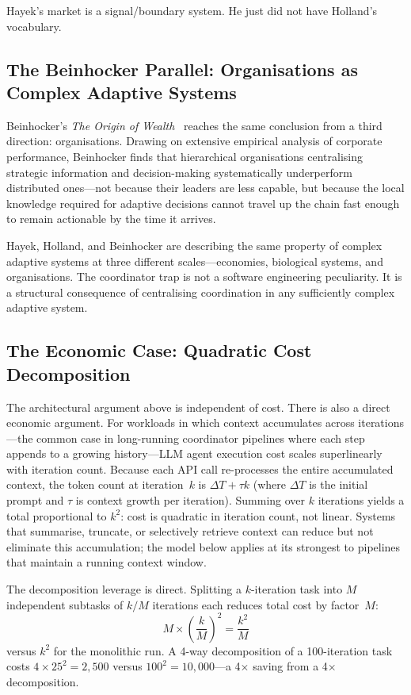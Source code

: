 \documentclass[11pt]{article}
\begin{document}
Hayek's market is a signal/boundary system. He just did not have Holland's
vocabulary.

\subsection{The Beinhocker Parallel: Organisations as Complex Adaptive Systems}

Beinhocker's \emph{The Origin of Wealth}~\cite{beinhocker} reaches the same
conclusion from a third direction: organisations. Drawing on extensive empirical
analysis of corporate performance, Beinhocker finds that hierarchical organisations
centralising strategic information and decision-making systematically underperform
distributed ones---not because their leaders are less capable, but because the
local knowledge required for adaptive decisions cannot travel up the chain fast
enough to remain actionable by the time it arrives.

Hayek, Holland, and Beinhocker are describing the same property of complex
adaptive systems at three different scales---economies, biological systems, and
organisations. The coordinator trap is not a software engineering peculiarity. It
is a structural consequence of centralising coordination in any sufficiently
complex adaptive system.

\subsection{The Economic Case: Quadratic Cost Decomposition}

The architectural argument above is independent of cost. There is also a direct
economic argument. For workloads in which context accumulates across
iterations---the common case
in long-running coordinator pipelines where each step appends to a growing
history---LLM agent execution cost scales superlinearly with iteration count.
Because each API call re-processes the entire accumulated context, the token
count at iteration~$k$ is $\Delta T + \tau k$ (where $\Delta T$ is the initial
prompt and $\tau$ is context growth per iteration). Summing over $k$ iterations
yields a total proportional to $k^2$: cost is quadratic in iteration count, not
linear. Systems that summarise, truncate, or selectively retrieve context can
reduce but not eliminate this accumulation; the model below applies at its
strongest to pipelines that maintain a running context window.

The decomposition leverage is direct. Splitting a $k$-iteration task into $M$
independent subtasks of $k/M$ iterations each reduces total cost by factor~$M$:
\[
  M \times \left(\frac{k}{M}\right)^2 = \frac{k^2}{M}
\]
versus $k^2$ for the monolithic run. A 4-way decomposition of a 100-iteration task
costs $4 \times 25^2 = 2{,}500$ versus $100^2 = 10{,}000$---a 4$\times$ saving
from a 4$\times$ decomposition.
\end{document}
